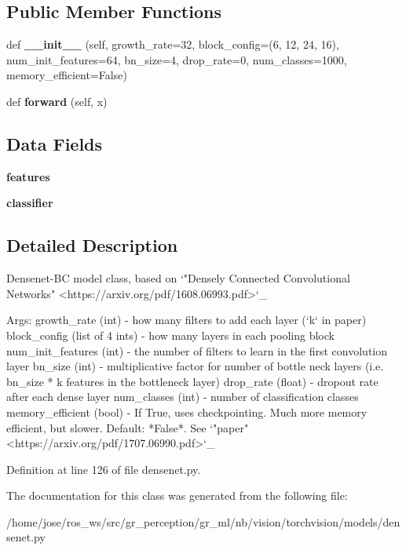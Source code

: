 \subsection*{Public Member Functions}
\begin{DoxyCompactItemize}
\item 
\mbox{\label{classtorchvision_1_1models_1_1densenet_1_1DenseNet_af8fab34d753fd0e0b2a556216cae60cc}} 
def {\bfseries \+\_\+\+\_\+init\+\_\+\+\_\+} (self, growth\+\_\+rate=32, block\+\_\+config=(6, 12, 24, 16), num\+\_\+init\+\_\+features=64, bn\+\_\+size=4, drop\+\_\+rate=0, num\+\_\+classes=1000, memory\+\_\+efficient=False)
\item 
\mbox{\label{classtorchvision_1_1models_1_1densenet_1_1DenseNet_aa964b1ee8e91c004df6fc0d7aeb5f3bf}} 
def {\bfseries forward} (self, x)
\end{DoxyCompactItemize}
\subsection*{Data Fields}
\begin{DoxyCompactItemize}
\item 
\mbox{\label{classtorchvision_1_1models_1_1densenet_1_1DenseNet_a350543366b48aff34edbb55381ed5062}} 
{\bfseries features}
\item 
\mbox{\label{classtorchvision_1_1models_1_1densenet_1_1DenseNet_a5125c7783ddabce5eb0ef3c8a221c196}} 
{\bfseries classifier}
\end{DoxyCompactItemize}


\subsection{Detailed Description}
\begin{DoxyVerb}Densenet-BC model class, based on
`"Densely Connected Convolutional Networks" <https://arxiv.org/pdf/1608.06993.pdf>`_

Args:
    growth_rate (int) - how many filters to add each layer (`k` in paper)
    block_config (list of 4 ints) - how many layers in each pooling block
    num_init_features (int) - the number of filters to learn in the first convolution layer
    bn_size (int) - multiplicative factor for number of bottle neck layers
      (i.e. bn_size * k features in the bottleneck layer)
    drop_rate (float) - dropout rate after each dense layer
    num_classes (int) - number of classification classes
    memory_efficient (bool) - If True, uses checkpointing. Much more memory efficient,
      but slower. Default: *False*. See `"paper" <https://arxiv.org/pdf/1707.06990.pdf>`_
\end{DoxyVerb}
 

Definition at line 126 of file densenet.\+py.



The documentation for this class was generated from the following file\+:\begin{DoxyCompactItemize}
\item 
/home/jose/ros\+\_\+ws/src/gr\+\_\+perception/gr\+\_\+ml/nb/vision/torchvision/models/densenet.\+py\end{DoxyCompactItemize}
